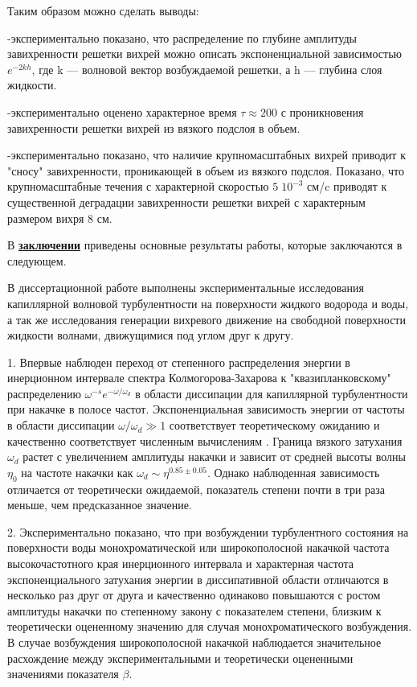 Таким образом можно сделать выводы:

-экспериментально показано, что распределение по глубине амплитуды завихренности решетки вихрей можно описать экспоненциальной зависимостью $e^{-2kh}$, где k — волновой вектор возбуждаемой решетки, а h — глубина слоя жидкости. 

-экспериментально оценено характерное время $\tau \approx 200$ с проникновения завихренности решетки вихрей из вязкого подслоя в объем. 

-экспериментально показано, что наличие крупномасштабных вихрей приводит к "сносу"{} завихренности, проникающей в объем из вязкого подслоя. Показано, что крупномасштабные течения с характерной скоростью $5 \; 10^{-3}$ см/c приводят к существенной деградации завихренности решетки вихрей с характерным размером вихря 8 см.


В \underline{\textbf{заключении}} приведены основные результаты работы, которые заключаются в следующем.

В диссертационной работе выполнены экспериментальные исследования капиллярной волновой турбулентности на поверхности жидкого водорода и воды, а так же исследования генерации вихревого движение на свободной поверхности жидкости волнами, движущимися под углом друг к другу.

1. Впервые наблюден переход от степенного распределения энергии в инерционном интервале спектра Колмогорова-Захарова к "квазипланковскому"{} распределению $\omega^{-s}e^{-\omega/\omega_d}$ в области диссипации для капиллярной турбулентности при накачке в полосе частот. Экспоненциальная зависимость энергии от частоты в области диссипации $\omega/\omega_d \gg 1$ соответствует теоретическому ожиданию и качественно соответствует численным вычислениям \cite{Ryzhenkova1990}. Граница вязкого затухания $\omega_d$ растет с увеличением амплитуды накачки и зависит от средней высоты волны $\eta_0$ на частоте накачки как $\omega_d \sim \eta^{0.85 \pm 0.05}$. Однако наблюденная зависимость отличается от теоретически ожидаемой, показатель степени почти в три раза меньше, чем предсказанное значение.

2. Экспериментально показано, что при возбуждении турбулентного состояния на поверхности воды монохроматической или широкополосной накачкой частота высокочастотного края инерционного интервала и характерная частота экспоненциального затухания энергии в диссипативной области отличаются в несколько раз друг от друга и качественно одинаково повышаются с ростом амплитуды накачки по степенному закону с показателем степени, близким к теоретически оцененному значению для случая монохроматического возбуждения. В случае возбуждения широкополосной накачкой наблюдается значительное расхождение между экспериментальными и теоретически оцененными значениями показателя $\beta$.

